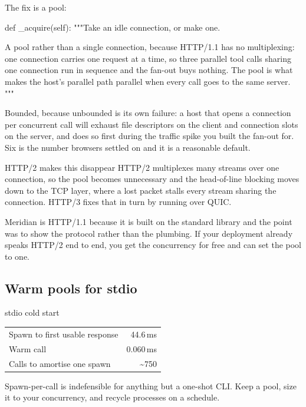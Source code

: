 The fix is a pool:

\begin{py}
def _acquire(self):
    """Take an idle connection, or make one.

    A pool rather than a single connection, because HTTP/1.1 has no
    multiplexing: one connection carries one request at a time, so three
    parallel tool calls sharing one connection run in sequence and the
    fan-out buys nothing. The pool is what makes the host's parallel path
    parallel when every call goes to the same server.
    """
\end{py}

Bounded, because unbounded is its own failure: a host that opens a connection per
concurrent call will exhaust file descriptors on the client and connection slots
on the server, and does so first during the traffic spike you built the fan-out
for. Six is the number browsers settled on and it is a reasonable default.

\begin{notebox}{HTTP/2 makes this disappear}
HTTP/2 multiplexes many streams over one connection, so the pool becomes
unnecessary and the head-of-line blocking moves down to the TCP layer, where a
lost packet stalls every stream sharing the connection. HTTP/3 fixes that in
turn by running over QUIC.

Meridian is HTTP/1.1 because it is built on the standard library and the point
was to show the protocol rather than the plumbing. If your deployment already
speaks HTTP/2 end to end, you get the concurrency for free and can set the pool
to one.
\end{notebox}

\subsection{Warm pools for stdio}

\begin{measurebox}{stdio cold start}
\begin{tabular}{@{}lr@{}}
\toprule
Spawn to first usable response & 44.6\,ms \\
Warm call                      & 0.060\,ms \\
Calls to amortise one spawn    & \textasciitilde{}750 \\
\bottomrule
\end{tabular}
\end{measurebox}

Spawn-per-call is indefensible for anything but a one-shot CLI. Keep a pool,
size it to your concurrency, and recycle processes on a schedule.

